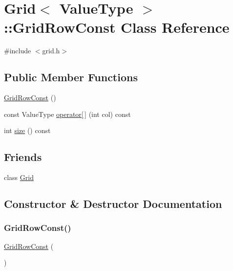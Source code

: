 \hypertarget{classGrid_1_1GridRowConst}{}\section{Grid$<$ Value\+Type $>$\+:\+:Grid\+Row\+Const Class Reference}
\label{classGrid_1_1GridRowConst}


{\ttfamily \#include $<$grid.\+h$>$}

\subsection*{Public Member Functions}
\begin{DoxyCompactItemize}
\item 
\mbox{\hyperlink{classGrid_1_1GridRowConst_a17bd70462bbfff3b2282b607f8060c9a}{Grid\+Row\+Const}} ()
\item 
const Value\+Type \mbox{\hyperlink{classGrid_1_1GridRowConst_a3dc8d98145632fca91f860f4f720e219}{operator\mbox{[}$\,$\mbox{]}}} (int col) const
\item 
int \mbox{\hyperlink{classGrid_1_1GridRowConst_af9593d4a5ff4274efaf429cb4f9e57cc}{size}} () const
\end{DoxyCompactItemize}
\subsection*{Friends}
\begin{DoxyCompactItemize}
\item 
class \mbox{\hyperlink{classGrid_1_1GridRowConst_a502b04f920610c0e574f2731a58681b4}{Grid}}
\end{DoxyCompactItemize}


\subsection{Constructor \& Destructor Documentation}
\mbox{\label{classGrid_1_1GridRowConst_a17bd70462bbfff3b2282b607f8060c9a}} 
\subsubsection{\texorpdfstring{Grid\+Row\+Const()}{GridRowConst()}}
{\footnotesize\ttfamily \mbox{\hyperlink{classGrid_1_1GridRowConst}{Grid\+Row\+Const}} (\begin{DoxyParamCaption}{ }\end{DoxyParamCaption})\hspace{0.3cm}{\ttfamily [inline]}}




